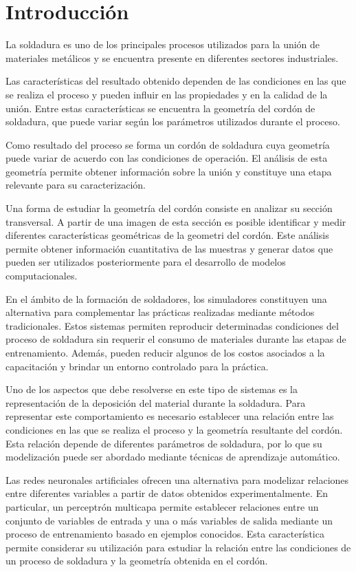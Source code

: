 \chapter{Introducción}

La soldadura es uno de los principales procesos utilizados para la unión de materiales metálicos y 
se encuentra presente en diferentes sectores industriales. 

Las características del resultado obtenido dependen de las condiciones en las que se realiza el proceso y pueden influir en las propiedades y en la calidad de la unión. Entre estas características se encuentra la geometría del cordón de soldadura, que puede variar según los parámetros utilizados durante el proceso.

Como resultado del proceso se forma un cordón de soldadura cuya geometría puede variar de acuerdo con las condiciones de operación. El análisis de esta geometría permite obtener información sobre la unión y constituye una etapa relevante para su caracterización. 

Una forma de estudiar la geometría del cordón consiste en analizar su sección transversal. A partir de una imagen de esta sección es posible identificar y medir diferentes características geométricas de la geometri del cordón. Este análisis permite obtener información cuantitativa de las muestras y generar datos que pueden ser utilizados posteriormente para el desarrollo de modelos computacionales.

En el ámbito de la formación de soldadores, los simuladores constituyen una alternativa para complementar las prácticas realizadas mediante métodos tradicionales. Estos sistemas permiten reproducir determinadas condiciones del proceso de soldadura sin requerir el consumo de materiales durante las etapas de entrenamiento. Además, pueden reducir algunos de los costos asociados a la capacitación y brindar un entorno controlado para la práctica.

Uno de los aspectos que debe resolverse en este tipo de sistemas es la representación de la deposición del material durante la soldadura. Para representar este comportamiento es necesario establecer una relación entre las condiciones en las que se realiza el proceso y la geometría resultante del cordón. Esta relación depende de diferentes parámetros de soldadura, por lo que su modelización puede ser abordado mediante técnicas de aprendizaje automático.

Las redes neuronales artificiales ofrecen una alternativa para modelizar relaciones entre diferentes variables a partir de datos obtenidos experimentalmente. En particular, un perceptrón multicapa permite establecer relaciones entre un conjunto de variables de entrada y una o más variables de salida mediante un proceso de entrenamiento basado en ejemplos conocidos. Esta característica permite considerar su utilización para estudiar la relación entre las condiciones de un proceso de soldadura y la geometría obtenida en el cordón.

